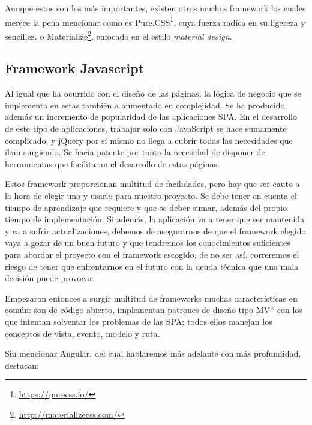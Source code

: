Aunque estos son los más importantes, existen otros muchos framework los cuales merece la pena mencionar como es Pure.CSS\footnote{\url{https://purecss.io/}}, cuya fuerza radica en su ligereza y sencillez, o Materialize\footnote{\url{http://materializecss.com/}}, enfocado en el estilo \emph{material design}.

\subsection{Framework Javascript}\label{subsec:frameworkJS}

 \cite{FramJSComp} Al igual que ha ocurrido con el diseño de las páginas, la lógica de negocio que se implementa en estas también a aumentado en complejidad. Se ha producido además un incremento de popularidad de las aplicaciones \gls{SPA}. En el desarrollo de este tipo de aplicaciones, trabajar solo con JavaScript se hace sumamente complicado, y  jQuery por si mismo no llega a cubrir todas las necesidades que iban surgiendo. Se hacia patente por tanto la necesidad de disponer de herramientas que facilitaran el desarrollo de estas páginas.

Estos framework proporcionan multitud de facilidades, pero hay que ser cauto a la hora de elegir uno y usarlo para nuestro proyecto. Se debe tener en cuenta el tiempo de aprendizaje que requiere y que se deber sumar, además del propio tiempo de implementación. Si además, la aplicación va a tener que ser mantenida y va a sufrir actualizaciones, debemos de asegurarnos de que el framework elegido vaya a gozar de un buen futuro y que tendremos los conocimientos suficientes para abordar el proyecto con el framework escogido, de no ser así, correremos el riesgo de tener que enfrentarnos en el futuro con la deuda técnica que una mala decisión puede provocar.

Empezaron entonces a surgir multitud de frameworks muchas características en común: son de código abierto, implementan patrones de diseño tipo \gls{MV*} con los que intentan solventar los problemas de las \gls{SPA}; todos ellos manejan los conceptos de vista, evento, modelo y ruta.

Sin mencionar Angular, del cual hablaremos más adelante con más profundidad, destacan:

